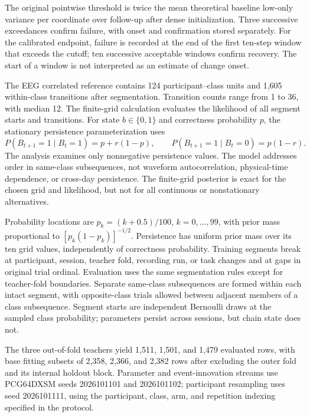 \documentclass[11pt,a4paper]{article}
\begin{document}
The original pointwise threshold is twice the mean theoretical baseline low-only variance per coordinate over follow-up after dense initialization. Three successive exceedances confirm failure, with onset and confirmation stored separately. For the calibrated endpoint, failure is recorded at the end of the first ten-step window that exceeds the cutoff; ten successive acceptable windows confirm recovery. The start of a window is not interpreted as an estimate of change onset.

The EEG correlated reference contains 124 participant--class units and 1,605 within-class transitions after segmentation. Transition counts range from 1 to 36, with median 12. The finite-grid calculation evaluates the likelihood of all segment starts and transitions. For state $b\in\{0,1\}$ and correctness probability $p$, the stationary persistence parameterization uses
\begin{equation}
 P(B_{t+1}=1\mid B_t=1)=p+r(1-p),\qquad
 P(B_{t+1}=1\mid B_t=0)=p(1-r).
\end{equation}
The analysis examines only nonnegative persistence values. The model addresses order in same-class subsequences, not waveform autocorrelation, physical-time dependence, or cross-day persistence. The finite-grid posterior is exact for the chosen grid and likelihood, but not for all continuous or nonstationary alternatives.

Probability locations are $p_k=(k+0.5)/100$, $k=0,\ldots,99$, with prior mass proportional to $[p_k(1-p_k)]^{-1/2}$. Persistence has uniform prior mass over its ten grid values, independently of correctness probability. Training segments break at participant, session, teacher fold, recording run, or task changes and at gaps in original trial ordinal. Evaluation uses the same segmentation rules except for teacher-fold boundaries. Separate same-class subsequences are formed within each intact segment, with opposite-class trials allowed between adjacent members of a class subsequence. Segment starts are independent Bernoulli draws at the sampled class probability; parameters persist across sessions, but chain state does not.

The three out-of-fold teachers yield 1,511, 1,501, and 1,479 evaluated rows, with base fitting subsets of 2,358, 2,366, and 2,382 rows after excluding the outer fold and its internal holdout block. Parameter and event-innovation streams use PCG64DXSM seeds 2026101101 and 2026101102; participant resampling uses seed 2026101111, using the participant, class, arm, and repetition indexing specified in the protocol.
\end{document}
